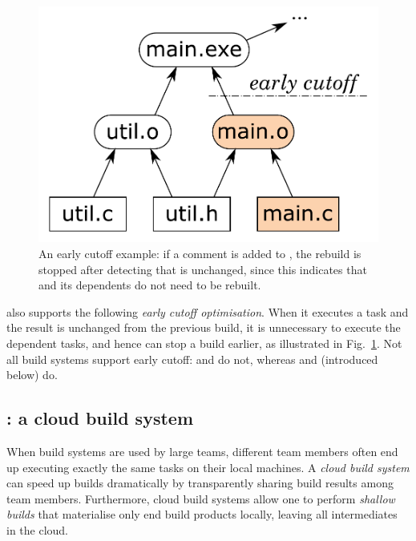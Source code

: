 \begin{figure}[h]
\vspace{-5mm}
\centerline{\includegraphics[scale=0.28]{fig/shake-example-cutoff.pdf}}
\vspace{-3mm}
\caption{An early cutoff example: if a comment is added to , the
rebuild is stopped after detecting that  is unchanged, since this
indicates that  and its dependents do not need to be
rebuilt.\label{fig-cutoff}}
\vspace{-2mm}
\end{figure}

\Shake also supports the following \emph{early cutoff optimisation}. When it
executes a task and the result is unchanged from the previous build, it is
unnecessary to execute the dependent tasks, and hence \Shake can stop a build
earlier, as illustrated in Fig.~\ref{fig-cutoff}. Not all build systems support
early cutoff: \Make and \Excel do not, whereas \Shake and \Bazel (introduced
below) do.

\subsection{\Bazel: a cloud build system}
\label{sec-background-bazel}

When build systems are used by large teams, different team members often end up
executing exactly the same tasks on their local machines. A \emph{cloud build
system} can speed up builds dramatically by transparently sharing build results
among team members. Furthermore, cloud build systems allow one to perform
\emph{shallow builds} that materialise only end build products locally, leaving
all intermediates in the cloud.

